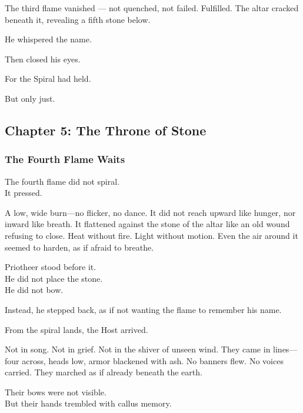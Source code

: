 \documentclass[12pt]{article}
\begin{document}
The third flame vanished — not quenched, not failed. Fulfilled. The altar cracked beneath it, revealing a fifth stone below.

He whispered the name.

Then closed his eyes.

For the Spiral had held.

But only just.

\newpage

\subsection{Chapter 5: The Throne of Stone}

\vspace{.5in}

\subsubsection{The Fourth Flame Waits}

The fourth flame did not spiral.\\
It pressed.

\vspace{0.5em}
A low, wide burn---no flicker, no dance. It did not reach upward like hunger, nor inward like breath. It flattened against the stone of the altar like an old wound refusing to close. Heat without fire. Light without motion. Even the air around it seemed to harden, as if afraid to breathe.

\vspace{0.5em}
Priotheer stood before it.\\
He did not place the stone.\\
He did not bow.

\vspace{0.5em}
Instead, he stepped back, as if not wanting the flame to remember his name.

\vspace{0.5em}
From the spiral lands, the Host arrived.

\vspace{0.5em}
Not in song. Not in grief. Not in the shiver of unseen wind. They came in lines---four across, heads low, armor blackened with ash. No banners flew. No voices carried. They marched as if already beneath the earth.

\vspace{0.5em}
Their bows were not visible.\\
But their hands trembled with callus memory.
\end{document}

